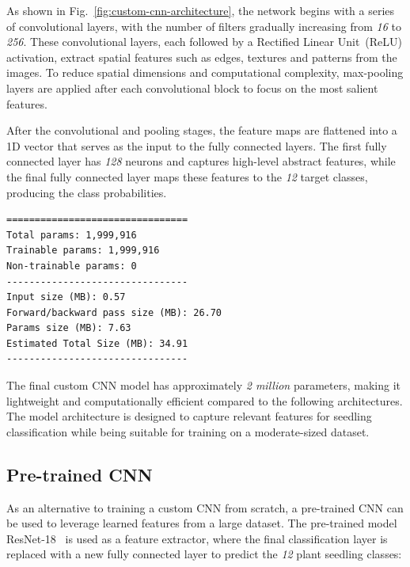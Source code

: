 As shown in Fig.~\ref{fig:custom-cnn-architecture}, the network begins with a series of convolutional layers, with the number of filters gradually increasing from \textit{16} to \textit{256}. These convolutional layers, each followed by a Rectified Linear Unit~(ReLU) activation, extract spatial features such as edges, textures and patterns from the images. To reduce spatial dimensions and computational complexity, max-pooling layers are applied after each convolutional block to focus on the most salient features.

After the convolutional and pooling stages, the feature maps are flattened into a 1D vector that serves as the input to the fully connected layers. The first fully connected layer has \textit{128} neurons and captures high-level abstract features, while the final fully connected layer maps these features to the \textit{12} target classes, producing the class probabilities.

\begin{minipage}{0.9\linewidth}\begin{lstlisting}[language={},caption={Custom CNN model summary.},label={lst:custom-cnn-summary}]
================================
Total params: 1,999,916
Trainable params: 1,999,916
Non-trainable params: 0
--------------------------------
Input size (MB): 0.57
Forward/backward pass size (MB): 26.70
Params size (MB): 7.63
Estimated Total Size (MB): 34.91
--------------------------------
\end{lstlisting}\end{minipage}

The final custom CNN model has approximately \textit{2 million} parameters, making it lightweight and computationally efficient compared to the following architectures. The model architecture is designed to capture relevant features for seedling classification while being suitable for training on a moderate-sized dataset.

\subsection{Pre-trained CNN}

As an alternative to training a custom CNN from scratch, a pre-trained CNN can be used to leverage learned features from a large dataset. The pre-trained model ResNet-18~\cite{DBLP:journals/corr/HeZRS15} is used as a feature extractor, where the final classification layer is replaced with a new fully connected layer to predict the \textit{12} plant seedling classes:

